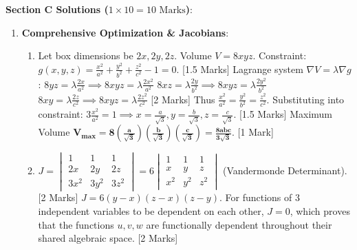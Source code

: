 \begin{solutionbox}
\medskip
\noindent\textbf{Section C Solutions ($1 \times 10 = 10\text{ Marks}$)}:
\begin{enumerate}[start=8]
    \item \textbf{Comprehensive Optimization \& Jacobians}:
    \begin{enumerate}[label=(\alph*)]
        \item Let box dimensions be $2x, 2y, 2z$. Volume $V = 8xyz$.
        Constraint: $g(x,y,z) = \frac{x^2}{a^2} + \frac{y^2}{b^2} + \frac{z^2}{c^2} - 1 = 0$. [1.5 Marks]
        Lagrange system $\nabla V = \lambda \nabla g$:
        $8yz = \lambda \frac{2x}{a^2} \implies 8xyz = \lambda \frac{2x^2}{a^2}$
        $8xz = \lambda \frac{2y}{b^2} \implies 8xyz = \lambda \frac{2y^2}{b^2}$
        $8xy = \lambda \frac{2z}{c^2} \implies 8xyz = \lambda \frac{2z^2}{c^2}$ [2 Marks]
        Thus $\frac{x^2}{a^2} = \frac{y^2}{b^2} = \frac{z^2}{c^2}$. Substituting into constraint:
        $3\frac{x^2}{a^2} = 1 \implies x = \frac{a}{\sqrt{3}}, y = \frac{b}{\sqrt{3}}, z = \frac{c}{\sqrt{3}}$. [1.5 Marks]
        Maximum Volume $\mathbf{V_{\max} = 8 \left(\frac{a}{\sqrt{3}}\right)\left(\frac{b}{\sqrt{3}}\right)\left(\frac{c}{\sqrt{3}}\right) = \frac{8abc}{3\sqrt{3}}}$. [1 Mark]

        \item $J = \begin{vmatrix} 1 & 1 & 1 \\ 2x & 2y & 2z \\ 3x^2 & 3y^2 & 3z^2 \end{vmatrix} = 6 \begin{vmatrix} 1 & 1 & 1 \\ x & y & z \\ x^2 & y^2 & z^2 \end{vmatrix}$ (Vandermonde Determinant). [2 Marks]
        $J = 6(y-x)(z-x)(z-y)$. For functions of 3 independent variables to be dependent on each other, $J = 0$, which proves that the functions $u, v, w$ are functionally dependent throughout their shared algebraic space. [2 Marks]
    \end{enumerate}
\end{enumerate}
\end{solutionbox}
